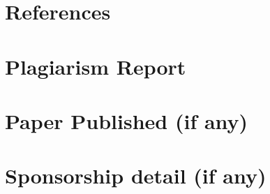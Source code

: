 \documentclass[12pt,a4]{report}
\begin{document}
\begin{appendices}
\chapter{References}

\chapter{Plagiarism Report }
\chapter{Paper Published (if any)}
\chapter{Sponsorship detail (if any)}
\end{appendices}
\end{document}
